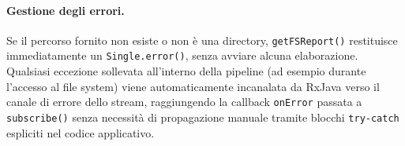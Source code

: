 \documentclass[11pt,a4paper]{article}
\begin{document}
\paragraph{Gestione degli errori.}

Se il percorso fornito non esiste o non è una directory, \texttt{getFSReport()} restituisce immediatamente un \texttt{Single.error()}, senza avviare alcuna elaborazione. Qualsiasi eccezione sollevata all'interno della pipeline (ad esempio durante l'accesso al file system) viene automaticamente incanalata da RxJava verso il canale di errore dello stream, raggiungendo la callback \texttt{onError} passata a \texttt{subscribe()} senza necessità di propagazione manuale tramite blocchi \texttt{try-catch} espliciti nel codice applicativo.
\end{document}
